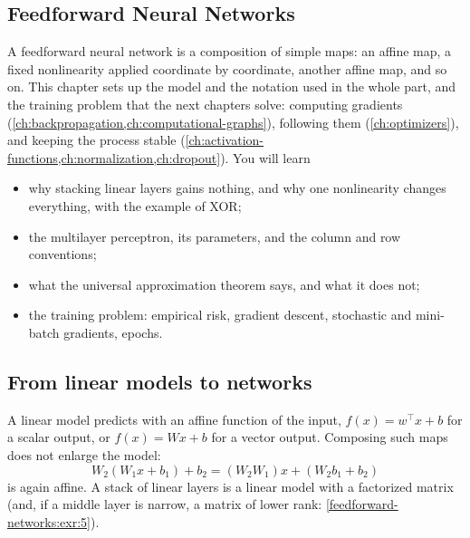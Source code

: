 \begin{notechapter}
\chapter{Feedforward Neural Networks}\label{ch:feedforward-networks}

\begin{chapterintro}
A feedforward neural network is a composition of simple maps: an affine map, a fixed
nonlinearity applied coordinate by coordinate, another affine map, and so on. This chapter
sets up the model and the notation used in the whole part, and the training problem that the
next chapters solve: computing gradients (\cref{ch:backpropagation,ch:computational-graphs}),
following them (\cref{ch:optimizers}), and keeping the process stable
(\cref{ch:activation-functions,ch:normalization,ch:dropout}). You will learn
\begin{itemize}[nosep]
  \item why stacking linear layers gains nothing, and why one nonlinearity changes everything,
        with the example of XOR;
  \item the multilayer perceptron, its parameters, and the column and row conventions;
  \item what the universal approximation theorem says, and what it does not;
  \item the training problem: empirical risk, gradient descent, stochastic and mini-batch
        gradients, epochs.
\end{itemize}
\end{chapterintro}

\section{From linear models to networks}\label{feedforward-networks:sec:linear}

A linear model predicts with an affine function of the input, $f(x) = w^\top x + b$ for a scalar
output, or $f(x) = Wx + b$ for a vector output. Composing such maps does not enlarge the model:
\[
  W_2(W_1x + b_1) + b_2 = (W_2W_1)x + (W_2b_1 + b_2)
\]
is again affine. A stack of linear layers is a linear model with a factorized matrix (and,
if a middle layer is narrow, a matrix of lower rank: \cref{feedforward-networks:exr:5}).


\end{notechapter}
